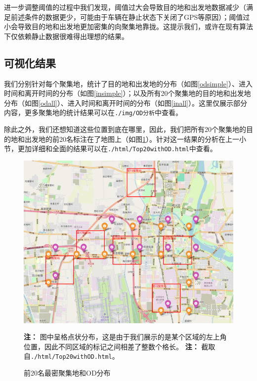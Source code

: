 \documentclass[UTF8]{ctexart}
\begin{document}
进一步调整阈值的过程中我们发现，阈值过大会导致目的地和出发地数据减少（满足前述条件的数据更少，可能由于车辆在静止状态下关闭了GPS等原因）；阈值过小会导致目的地和出发地更加密集的向聚集地靠拢。这提示我们，或许在现有算法下仅依赖静止数据很难得出理想的结果。

\subsection{可视化结果}

我们分别针对每个聚集地，统计了目的地和出发地的分布（如图\ref{odsimple}）、进入时间和离开时间的分布（如图\ref{insimple}）；以及所有20个聚集地的目的地和出发地分布（如图\ref{odall}）、进入时间和离开时间的分布（如图\ref{inall}）。这里仅展示部分内容，更多聚集地的统计结果可以在\texttt{./img/OD分析}中查看。


除此之外，我们还想知道这些位置到底在哪里，因此，我们把所有20个聚集地的目的地和出发地的前20名标注在了地图上（如图\ref{odmap}）。针对这一结果的分析在上一小节，更加详细和全面的结果可以在\texttt{./html/Top20withOD.html}中查看。

\begin{figure}[htb]
    \centering
    \begin{minipage}{\textwidth}
        \centering
        \includegraphics[width=\textwidth]{../img/聚集地和OD地图可视化.png}
        \caption{前20名最密聚集地和OD分布}
        \label{odmap}
    \end{minipage}
    \vspace{1em} %
    \begin{minipage}{\textwidth}
        \footnotesize %
        \textbf{注：} 图中呈格点状分布，这是由于我们展示的是某个区域的左上角位置，因此不同区域的标记之间相差了整数个格长。
        \textbf{注：} 截取自\texttt{./html/Top20withOD.html}。 
    \end{minipage}
\end{figure}
\end{document}
